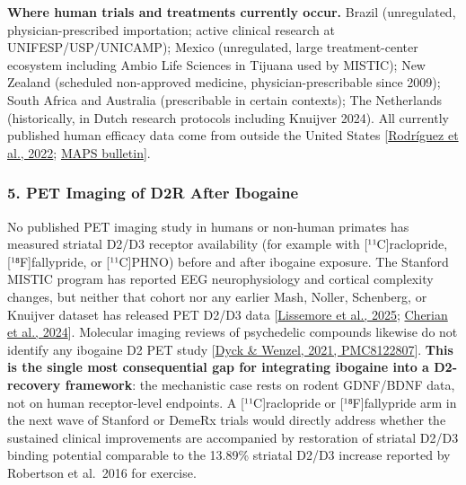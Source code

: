 \begin{itemize}
  \textbf{Where human trials and treatments currently occur.} Brazil (unregulated, physician-prescribed importation; active clinical research at UNIFESP/USP/UNICAMP); Mexico (unregulated, large treatment-center ecosystem including Ambio Life Sciences in Tijuana used by MISTIC); New Zealand (scheduled non-approved medicine, physician-prescribable since 2009); South Africa and Australia (prescribable in certain contexts); The Netherlands (historically, in Dutch research protocols including Knuijver 2024). All currently published human efficacy data come from outside the United States {[}\href{https://pubmed.ncbi.nlm.nih.gov/35012793/}{Rodríguez et al., 2022}; \href{https://maps.org/news/bulletin/the-case-of-brazil-after-ayahuasca-ibogaine-opens-up-opportunity-for-first-class-research-in-the-global-south/}{MAPS bulletin}{]}.
\end{itemize}

\subsubsection{5. PET Imaging of D2R After Ibogaine}\label{20_ibogaine-pet-imaging-of-d2r-after-ibogaine}

No published PET imaging study in humans or non-human primates has measured striatal D2/D3 receptor availability (for example with {[}¹¹C{]}raclopride, {[}¹⁸F{]}fallypride, or {[}¹¹C{]}PHNO) before and after ibogaine exposure. The Stanford MISTIC program has reported EEG neurophysiology and cortical complexity changes, but neither that cohort nor any earlier Mash, Noller, Schenberg, or Knuijver dataset has released PET D2/D3 data {[}\href{https://www.usmedicine.com/clinical-topics/tbi/magnesium-ibogaine-therapy-could-offer-treatment-option-for-tbi/}{Lissemore et al., 2025}; \href{https://pubmed.ncbi.nlm.nih.gov/38182784/}{Cherian et al., 2024}{]}. Molecular imaging reviews of psychedelic compounds likewise do not identify any ibogaine D2 PET study {[}\href{https://pmc.ncbi.nlm.nih.gov/articles/PMC8122807/}{Dyck \& Wenzel, 2021, PMC8122807}{]}. \textbf{This is the single most consequential gap for integrating ibogaine into a D2-recovery framework}: the mechanistic case rests on rodent GDNF/BDNF data, not on human receptor-level endpoints. A {[}¹¹C{]}raclopride or {[}¹⁸F{]}fallypride arm in the next wave of Stanford or DemeRx trials would directly address whether the sustained clinical improvements are accompanied by restoration of striatal D2/D3 binding potential comparable to the 13.89\% striatal D2/D3 increase reported by Robertson et al.~2016 for exercise.

